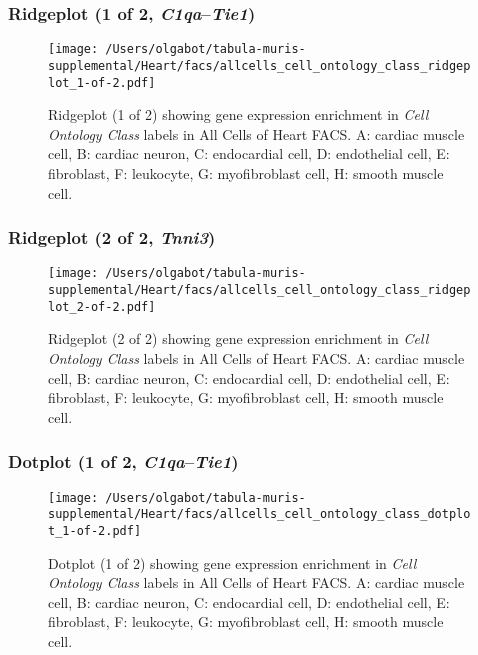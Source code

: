 \clearpage

\subsubsection{Ridgeplot (1 of 2, \emph{C1qa}--\emph{Tie1})}
\begin{figure}[h]
\centering
\texttt{[image: /Users/olgabot/tabula-muris-supplemental/Heart/facs/allcells\_cell\_ontology\_class\_ridgeplot\_1-of-2.pdf]}

\caption{ Ridgeplot (1 of 2)  showing gene expression enrichment in \emph{Cell Ontology Class} labels in All Cells of Heart FACS. A: cardiac muscle cell, B: cardiac neuron, C: endocardial cell, D: endothelial cell, E: fibroblast, F: leukocyte, G: myofibroblast cell, H: smooth muscle cell.}
\end{figure}


\clearpage

\subsubsection{Ridgeplot (2 of 2, \emph{Tnni3})}
\begin{figure}[h]
\centering
\texttt{[image: /Users/olgabot/tabula-muris-supplemental/Heart/facs/allcells\_cell\_ontology\_class\_ridgeplot\_2-of-2.pdf]}

\caption{ Ridgeplot (2 of 2)  showing gene expression enrichment in \emph{Cell Ontology Class} labels in All Cells of Heart FACS. A: cardiac muscle cell, B: cardiac neuron, C: endocardial cell, D: endothelial cell, E: fibroblast, F: leukocyte, G: myofibroblast cell, H: smooth muscle cell.}
\end{figure}


\clearpage

\subsubsection{Dotplot (1 of 2, \emph{C1qa}--\emph{Tie1})}
\begin{figure}[h]
\centering
\texttt{[image: /Users/olgabot/tabula-muris-supplemental/Heart/facs/allcells\_cell\_ontology\_class\_dotplot\_1-of-2.pdf]}

\caption{ Dotplot (1 of 2)  showing gene expression enrichment in \emph{Cell Ontology Class} labels in All Cells of Heart FACS. A: cardiac muscle cell, B: cardiac neuron, C: endocardial cell, D: endothelial cell, E: fibroblast, F: leukocyte, G: myofibroblast cell, H: smooth muscle cell.}
\end{figure}


